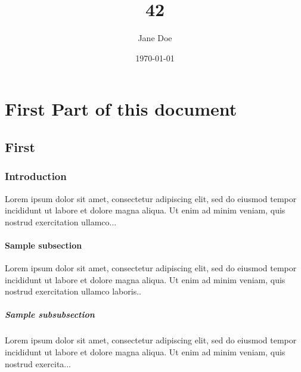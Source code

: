 \documentclass{book}
\title{42}
\author{Jane Doe}
\date{\today}
\begin{document}
\maketitle

\tableofcontents

\part{First Part of this document}

\chapter{First}

\section{Introduction}
Lorem ipsum dolor sit amet, consectetur adipiscing elit, sed do 
eiusmod tempor incididunt ut labore et dolore magna aliqua. Ut 
enim ad minim veniam, quis nostrud exercitation ullamco...

\subsection{Sample subsection}
Lorem ipsum dolor sit amet, consectetur adipiscing elit, sed do 
eiusmod tempor incididunt ut labore et dolore magna aliqua. Ut 
enim ad minim veniam, quis nostrud exercitation ullamco laboris..

\subsubsection{Sample subsubsection}
Lorem ipsum dolor sit amet, consectetur adipiscing elit, sed do 
eiusmod tempor incididunt ut labore et dolore magna aliqua. Ut 
enim ad minim veniam, quis nostrud exercita...
\end{document}

